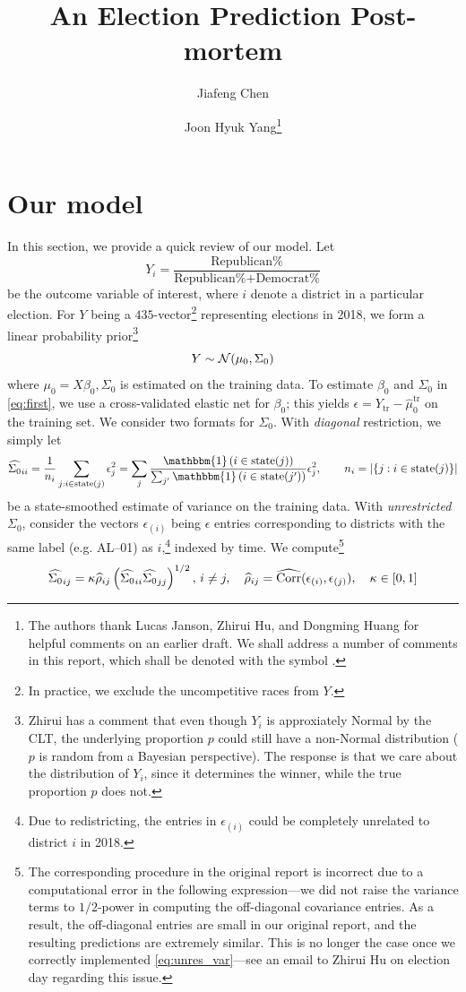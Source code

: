 \documentclass[12pt]{article}
\title{\vspace{-1.5cm}\sffamily\bfseries{An Election Prediction Post-mortem}}
\author{\vspace{-.5cm}Jiafeng Chen \and Joon Hyuk Yang\thanks{The authors thank Lucas Janson, Zhirui Hu, and Dongming Huang for helpful comments on an earlier draft. We shall address a number of comments in this report, which shall be denoted with the symbol \cm.}}
\newcommand{\cm}{{\color{Red}{\textsf{[C]}}}}
\newcommand{\one}{\mathbbm{1}}
\begin{document}
\maketitle
\section{Our model}
\label{sec:intro}

In this section, we provide a quick review of our model. Let \begin{equation}
  Y_i = \frac{\text{Republican\%}}{\text{Republican\%}+\text{Democrat\%}}
  \label{eq:def_y}
\end{equation}
be the outcome variable of interest, where $i$ denote a district in a particular election. For $Y$ being a $435$-vector\footnote{In practice, we exclude the uncompetitive races from $Y$.} representing elections in 2018, we form a linear probability prior\footnote{\cm{} Zhirui has a comment that even though $Y_i$ is approxiately Normal by the CLT, the underlying proportion $p$ could still have a non-Normal distribution ($p$ is random from a Bayesian perspective). The response is that we care about the distribution of $Y_i$, since it determines the winner, while the true proportion $p$ does not.} \begin{equation}
  Y \sim \mathcal{N}(\mu_0, \Sigma_0)\label{eq:first}
\end{equation}
where $\mu_0 = X\beta_0, \Sigma_0$ is estimated
on the training data. To estimate $\beta_0$ and $\Sigma_0$ in \eqref{eq:first}, we use a cross-validated elastic net for $\beta_0$; this yields $\epsilon = Y_{\text{tr}} - \hat \mu_0^{\text{tr}}$ on the training set. We consider two formats for $\Sigma_0$. With \emph{diagonal} restriction, we simply let 
\begin{equation}
  \hat {\Sigma_0}_{ii} = \frac{1}{n_i} \sum_{j : i\in\text{state}(j)} \epsilon_j^2 = \sum_j \frac{\one\pr{i\in\text{state}(j)}}{\sum_{j'} \one\pr{i\in\text{state}(j')}} \epsilon_j^2, \qquad n_i = |\{j : i\in\text{state}(j)\}|
\label{eq:diag_var}
\end{equation}
be a state-smoothed estimate of variance on the training data. With \emph{unrestricted} $\Sigma_0$, consider the vectors $\epsilon_{(i)}$ being $\epsilon$ entries corresponding to districts with the same label (e.g. AL--01) as $i$,\footnote{Due to redistricting, the entries in $\epsilon_{(i)}$ could be completely unrelated to district $i$ in 2018.} indexed by time. We compute\footnote{\cm{} The corresponding procedure in the original report is incorrect due to a computational error in the following expression---we did not raise the variance terms to $1/2$-power in computing the off-diagonal covariance entries. As a result, the off-diagonal entries are small in our original report, and the resulting predictions are extremely similar. This is no longer the case once we correctly implemented \eqref{eq:unres_var}---see an email to Zhirui Hu on election day regarding this issue.} \begin{equation}
  \widehat{\Sigma_0}_{ij} = \kappa \widehat \rho_{ij} \left({\widehat {\Sigma_0}_{ii} \widehat {\Sigma_0}_{jj}}\right)^{1/2},\, i\neq j,\quad \widehat \rho_{ij} = \widehat{\operatorname{Corr}}(\epsilon_{(i)}, \epsilon_{(j)}), \quad \kappa\in [0,1]
\label{eq:unres_var}
\end{equation}
\end{document}
